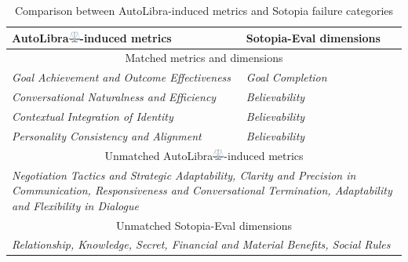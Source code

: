 \begin{table}[!h]
\centering
\begin{tabular}{ll}
    \toprule
    AutoLibra\protect\includegraphics[height=1em]{figs/scale.png}-induced metrics & Sotopia-Eval dimensions\\
    \midrule
    \multicolumn{2}{c}{Matched metrics and dimensions}\\\midrule
    \textit{Goal Achievement and Outcome Effectiveness} & \textit{Goal Completion}\\
    \textit{Conversational Naturalness and Efficiency} & \textit{Believability} \\
    \textit{Contextual Integration of Identity} & \textit{Believability}\\
    \textit{Personality Consistency and Alignment} & \textit{Believability}\\ \midrule
    \multicolumn{2}{c}{Unmatched AutoLibra\protect\includegraphics[height=1em]{figs/scale.png}-induced metrics}\\\midrule
     \multicolumn{2}{C{0.8\textwidth}}{\textit{Negotiation Tactics and Strategic Adaptability, Clarity and Precision in Communication, Responsiveness and Conversational Termination, Adaptability and Flexibility in Dialogue}} \\ \midrule
     \multicolumn{2}{c}{Unmatched Sotopia-Eval dimensions}\\\midrule
     \multicolumn{2}{C{0.8\textwidth}}{\textit{Relationship, Knowledge, Secret, Financial and Material Benefits, Social Rules}} \\\bottomrule
\end{tabular}
\caption{Comparison between AutoLibra-induced metrics and Sotopia failure categories}
\label{tab:lens_sotopia}
\end{table}

